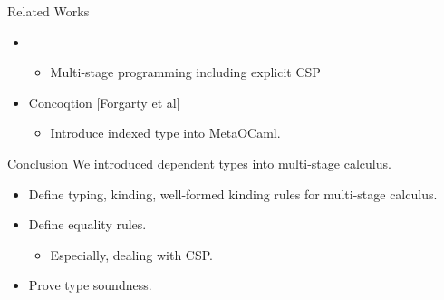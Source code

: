 \documentclass[dvipdfmx,aspectratio=169, 20pt]{beamer}
\begin{document}
\begin{frame}[fragile]{Related Works}
    \begin{itemize}
        \item {}
            \begin{itemize}
                \item Multi-stage programming including explicit CSP
            \end{itemize}
        \item Concoqtion [Forgarty et al]
            \begin{itemize}
                \item Introduce indexed type into MetaOCaml.
            \end{itemize}
    \end{itemize}
    \note{
    }
\end{frame}

\begin{frame}[fragile]{Conclusion}
    We introduced dependent types into multi-stage calculus.
    \begin{itemize}
        \item Define typing, kinding, well-formed kinding rules for multi-stage calculus.
            \item Define equality rules.
                \begin{itemize}
                        \item Especially, dealing with CSP.
                \end{itemize}
            \item Prove type soundness.
        \end{itemize}
    \note{
    }
\end{frame}

\end{document}
